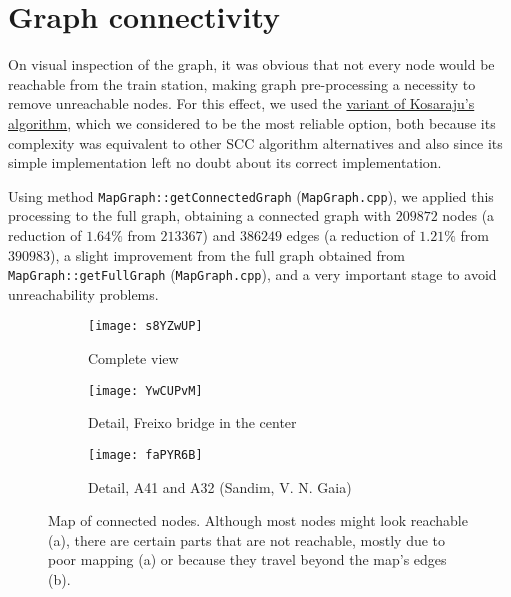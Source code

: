 \chapter{Graph connectivity} \label{connectivity-graphs}
On visual inspection of the graph, it was obvious that not every node would be reachable from the train station, making graph pre-processing a necessity to remove unreachable nodes.
For this effect, we used the \hyperref[algorithm-scc-kosaraju-v]{variant of Kosaraju's algorithm}, which we considered to be the most reliable option, both because its complexity was equivalent to other \acrshort{SCC} algorithm alternatives and also since its simple implementation left no doubt about its correct implementation.\par
Using method \texttt{MapGraph::getConnectedGraph} (\texttt{MapGraph.cpp}), we applied this processing to the full graph, obtaining a connected graph with $209872$ nodes (a reduction of $1.64\%$ from $213367$) and $386249$ edges (a reduction of $1.21\%$ from $390983$), a slight improvement from the full graph obtained from \texttt{MapGraph::getFullGraph} (\texttt{MapGraph.cpp}), and a very important stage to avoid unreachability problems.
\begin{figure}[h]
    \centering
    \begin{subfigure}{.50\textwidth}
        \centering
        \texttt{[image: s8YZwUP]}
        \caption{Complete view}
    \end{subfigure}
    \begin{subfigure}{.49\textwidth}
        \centering
        \texttt{[image: YwCUPvM]}
        \caption{Detail, Freixo bridge in the center}
        \vspace{0.6em}
        \texttt{[image: faPYR6B]}
        \caption{Detail, A41 and A32 (Sandim, V. N. Gaia)}
    \end{subfigure}
    \caption[Map of connected nodes]{Map of connected nodes. Although most nodes might look reachable (a), there are certain parts that are not reachable, mostly due to poor mapping (a) or because they travel beyond the map's edges (b).}
\end{figure}
